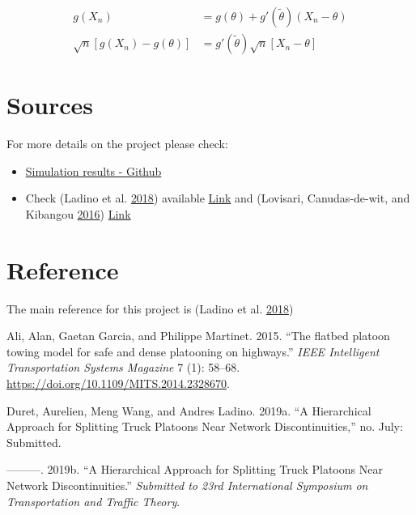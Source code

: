 \documentclass[]{book}
\theoremstyle{definition}
\theoremstyle{definition}
\theoremstyle{definition}
\theoremstyle{remark}
\begin{document}
\begin{align}
g(X_{n}) &= g(\theta)+g'({\tilde{\theta}})(X_{n}-\theta)\\
\sqrt{n}[g(X_{n})-g(\theta)] &= g'\left({\tilde{\theta}}\right)
  \sqrt{n}[X_{n}-\theta ] \label{eq:align}
\end{align}

\hypertarget{sources-2}{%
\section*{Sources}\label{sources-2}}

For more details on the project please check:

\begin{itemize}
\item
  \href{https://github.com/aladinoster/density-reconstruction}{Simulation
  results - Github}
\item
  Check (Ladino et al. \protect\hyperlink{ref-Ladino2018}{2018})
  available \href{https://hal.archives-ouvertes.fr/hal-01731356}{Link}
  and (Lovisari, Canudas-de-wit, and Kibangou
  \protect\hyperlink{ref-Lovisari2016}{2016})
  \href{https://hal.archives-ouvertes.fr/hal-01375928}{Link}
\end{itemize}

\hypertarget{reference}{%
\section*{Reference}\label{reference}}

The main reference for this project is (Ladino et al.
\protect\hyperlink{ref-Ladino2018}{2018})

\hypertarget{refs}{}
\leavevmode\hypertarget{ref-Ali2015:ITSM}{}%
Ali, Alan, Gaetan Garcia, and Philippe Martinet. 2015. ``The flatbed
platoon towing model for safe and dense platooning on highways.''
\emph{IEEE Intelligent Transportation Systems Magazine} 7 (1): 58--68.
\url{https://doi.org/10.1109/MITS.2014.2328670}.

\leavevmode\hypertarget{ref-Duret2019:ISTTT}{}%
Duret, Aurelien, Meng Wang, and Andres Ladino. 2019a. ``A Hierarchical
Approach for Splitting Truck Platoons Near Network Discontinuities,''
no. July: Submitted.

\leavevmode\hypertarget{ref-Duret2019}{}%
---------. 2019b. ``A Hierarchical Approach for Splitting Truck Platoons
Near Network Discontinuities.'' \emph{Submitted to 23rd International
Symposium on Transportation and Traffic Theory}.
\end{document}
